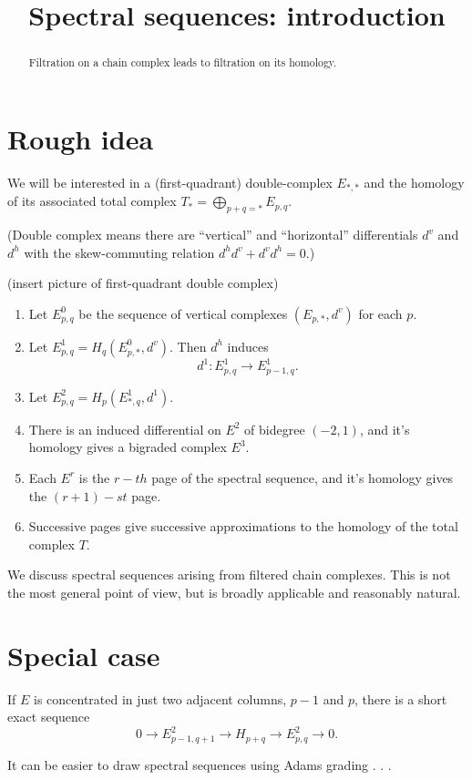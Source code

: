 \documentclass{ximera}
\title{Spectral sequences: introduction}
\begin{document}
\begin{abstract}
  Filtration on a chain complex leads to filtration on its homology.
\end{abstract}
\maketitle

\section{Rough idea}

We will be interested in a (first-quadrant) double-complex $E_{*,*}$
and the homology of its associated total complex $T_* = \bigoplus_{p +
  q = *} E_{p,q}$.

(Double complex means there are ``vertical'' and ``horizontal'' differentials $d^v$ and $d^h$ with the skew-commuting relation $d^h d^v + d^v d^h = 0$.)

\begin{image}
  (insert picture of first-quadrant double complex)
\end{image}

\begin{enumerate}
\item Let $E^0_{p,q}$ be the sequence of vertical complexes $(E_{p,*},d^v)$ for each $p$.
\item Let $E^1_{p,q} = H_q(E^0_{p,*}, d^v)$.  Then $d^h$ induces
  \[
  d^1: E^1_{p,q} \rightarrow E^1_{p-1,q}.
  \]
\item Let $E^2_{p,q} = H_p(E^1_{*,q}, d^1)$.
\item There is an induced differential on $E^2$ of bidegree $(-2,1)$,
  and it's homology gives a bigraded complex $E^3$.
\item Each $E^r$ is the $r-th$ page of the spectral sequence, and it's
  homology gives the $(r+1)-st$ page.
\item Successive pages give successive approximations to the homology
  of the total complex $T$.
\end{enumerate}


We discuss spectral sequences arising from filtered chain complexes.
This is not the most general point of view, but is broadly applicable
and reasonably natural.

\section{Special case}

If $E$ is concentrated in just two adjacent columns, $p-1$ and $p$,
there is a short exact sequence
\[
0 \rightarrow E^2_{p-1,q+1} \rightarrow H_{p+q} \rightarrow E^2_{p,q} \rightarrow 0.
\]


\begin{note}
It can be easier to draw spectral sequences using Adams grading . . .
\end{note}
\end{document}
